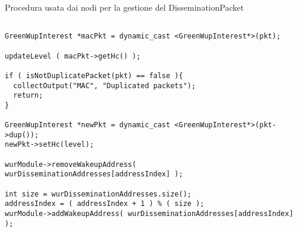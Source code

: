 \begin{listing}[h]
    \caption{Procedura usata dai nodi per la gestione del DisseminationPacket}
    \label{code:forwardDP}
    \begin{verbatim}

GreenWupInterest *macPkt = dynamic_cast <GreenWupInterest*>(pkt);

updateLevel ( macPkt->getHc() );

if ( isNotDuplicatePacket(pkt) == false ){
  collectOutput("MAC", "Duplicated packets");
  return;
}

GreenWupInterest *newPkt = dynamic_cast <GreenWupInterest*>(pkt->dup());
newPkt->setHc(level);

wurModule->removeWakeupAddress( wurDisseminationAddresses[addressIndex] );

int size = wurDisseminationAddresses.size();
addressIndex = ( addressIndex + 1 ) % ( size );
wurModule->addWakeupAddress( wurDisseminationAddresses[addressIndex] );

    \end{verbatim}
\end{listing}